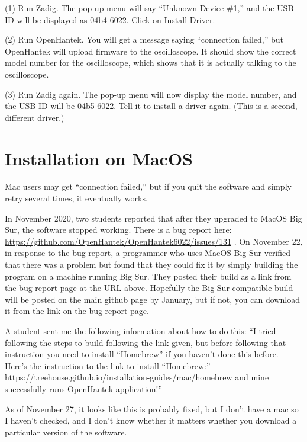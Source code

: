 (1) Run Zadig. The pop-up menu will say ``Unknown Device \#1,'' and
the USB ID will be displayed as 04b4 6022. Click on Install Driver.

(2) Run OpenHantek. You will get a message saying ``connection failed,'' but OpenHantek
will upload firmware to the oscilloscope. It should show the correct model number for
the oscilloscope, which shows that it is actually talking to the oscilloscope.

(3) Run Zadig again. The pop-up menu will now display the model number, and
the USB ID will be 04b5 6022. Tell it to install a driver again. (This is a
second, different driver.)


\section*{Installation on MacOS}

Mac users may get ``connection failed,'' but if you quit
the software and simply retry several times, it eventually works.

In November 2020, two students reported that after they upgraded to MacOS Big Sur,
the software stopped working. There is a bug report here: \url{https://github.com/OpenHantek/OpenHantek6022/issues/131} .
On November 22, in response to the bug report, a programmer who uses MacOS Big Sur verified that there was a problem
but found that they could fix it by simply building the program on a machine running
Big Sur. They posted their build as a link from the bug report page at the URL above. Hopefully the
Big Sur-compatible build will be posted on the main github page by January, but if not, you can
download it from the link on the bug report page.

A student sent me the following information about how to do this:
``I tried following the steps to build following the link given, but
before following that instruction you need to install ``Homebrew'' if
you haven't done this before.
Here's the instruction to the link to install ``Homebrew:''
https://treehouse.github.io/installation-guides/mac/homebrew
and mine successfully runs OpenHantek application!''

As of November 27, it looks like this is probably fixed, but I don't have a mac so I haven't
checked, and I don't know whether it matters whether you download a particular version of the software.


